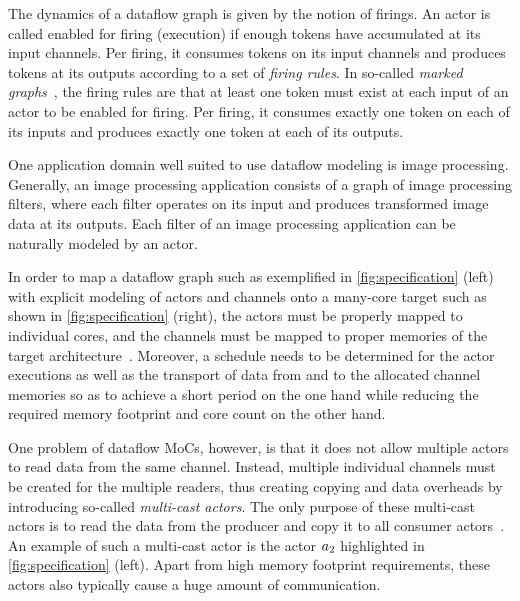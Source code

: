 The dynamics of a dataflow graph is given by the notion of firings.
An actor is called enabled for firing (execution) if enough tokens have accumulated at its input channels.
Per firing, it consumes tokens on its input channels and produces tokens at its outputs according to a set of \emph{firing rules}.
In so-called \emph{marked graphs}~\cite{chep_1971-marked-graphs}, the firing rules are that at least one token must exist at each input of an actor to be enabled for firing.
Per firing, it consumes exactly one token on each of its inputs and produces exactly one token at each of its outputs.
\par
One application domain well suited to use dataflow modeling is image processing.
Generally, an image processing application consists of a graph of image processing filters, where each filter operates on its input and produces transformed image data at its outputs.
Each filter of an image processing application can be naturally modeled by an actor. %
\par
In order to map a dataflow graph such as exemplified in \cref{fig:specification} (left) with explicit modeling of actors and channels onto a many-core target such as shown in \cref{fig:specification} (right), the actors must be properly mapped to individual cores, and the channels must be mapped to proper memories of the target architecture~\cite{Falk2019,Blickle1998}.
Moreover, a schedule needs to be determined for the actor executions as well as the transport of data from and to the allocated channel memories so as to achieve a short period on the one hand while reducing the required memory footprint and core count on the other hand.
\par
One problem of dataflow \acp{MoC}, however, is that it does not allow multiple actors to read data from the same channel.
Instead, multiple individual channels must be created for the multiple readers, thus creating copying and data overheads by introducing so-called \emph{multi-cast actors}.
The only purpose of these multi-cast actors is to read the data from the producer and copy it to all consumer actors~\cite{Letras:2017,Keinert:2009,memFIFO}.
An example of such a multi-cast actor is the actor $a_2$ highlighted in \cref{fig:specification} (left).
Apart from high memory footprint requirements, these  actors also typically cause a huge amount of communication.
\par
